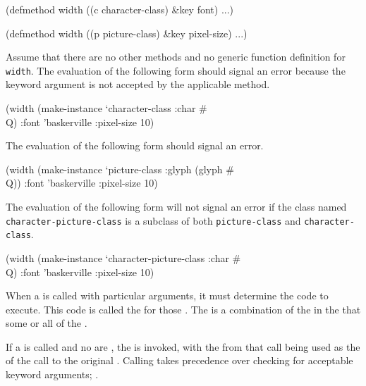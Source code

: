 \code
 (defmethod width ((c character-class) &key font) ...)
 
 (defmethod width ((p picture-class) &key pixel-size) ...)
\endcode

\noindent Assume that there are no other methods and no generic
function definition for {\tt width}. The evaluation of the
following form should signal an error because 
the keyword argument  is not accepted by the applicable method.

\code
 (width (make-instance `character-class :char #\\Q) 
        :font 'baskerville :pixel-size 10)
\endcode

The evaluation of the following form should signal an error.

\code
 (width (make-instance `picture-class :glyph (glyph #\\Q)) 
        :font 'baskerville :pixel-size 10)
\endcode

The evaluation of the following form will not signal an error
if the class named {\tt character-picture-class} is a subclass of
both {\tt picture-class} and {\tt character-class}.

\code
 (width (make-instance `character-picture-class :char #\\Q)
        :font 'baskerville :pixel-size 10)
\endcode

\endsubsubsection%

\endSubsection%


When a  is called with particular arguments, it must
determine the code to execute.  This code is called the 
 for those .
The  is a 
combination of the  in the 
that  some or all of the .

If a  is called and no  are 
, the  
is invoked, with the  from that call being used as the
 of the call to the original .  Calling
 takes precedence over checking for acceptable
keyword arguments; \seesection\KwdArgsInGFsAndMeths.

